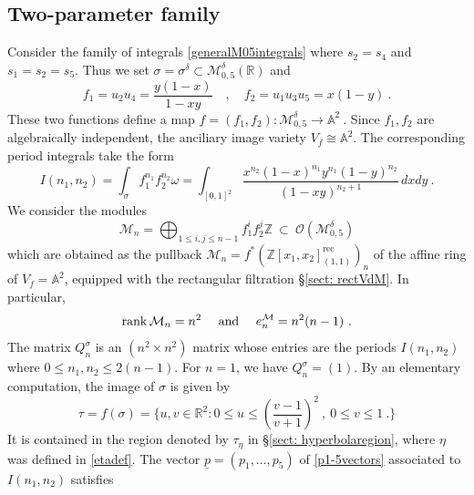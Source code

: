\documentclass[a4paper,10pt]{amsart}
\theoremstyle{definition}
\theoremstyle{remark}
\numberwithin{equation}{section}
\newcommand{\Z}{\mathbb Z}
\newcommand{\R}{\mathbb R}
\newcommand{\Or}{\mathcal{O}}
\newcommand{\rank}{\mathrm{rank}}
\newcommand{\0}{\color{blue}{\mathsf{0}}}
\begin{document}
    \subsection{Two-parameter family}  Consider the family of integrals   \eqref{generalM05integrals} where $s_2=s_4$ and $s_1=s_2=s_5$.
    Thus we set $\sigma = \sigma^{\delta} \subset \mathcal{M}_{0,5}^{\delta}(\R)$ and  
    \begin{equation} \label{M052paramchoices} f_1=  u_2u_4 = \frac{ y(1-x)}{1-xy}  \quad , \quad f_2 = u_1u_3u_5 = x(1-y)  \ . 
    \end{equation}
    These two functions define a map 
    $f=(f_1,f_2) : \mathcal{M}_{0,5}^{\delta} \rightarrow \mathbb{A}^2\ . $
    Since $f_1,f_2$ are algebraically independent, the anciliary image variety $V_f \cong  \mathbb{A}^2$.
      The corresponding period integrals take the form     \[  I(n_1,n_2) =  \int_{\sigma}   f_1^{n_1} f_2^{n_2} \omega =  \int_{[0,1]^2}   \frac{  x^{n_2} (1-x)^{n_1} y^{n_1} (1-y)^{n_2}}{ (1-xy)^{n_2+1} } \, dx dy  \ . \]
      We consider the modules  
      \begin{equation} \label{Mndefnzeta2} \mathcal{M}_n  = \bigoplus_{1\leq i,j\leq n-1}  f_1^i f_2^j  \Z  \  \subset  \ \Or (\mathcal{M}_{0,5}^{\delta})  \end{equation}
      which are obtained as  the pullback $\mathcal{M}_n = f^* (\Z[x_1,x_2]^{\mathrm{rec}}_{(1,1)})_n$ of the affine ring of $V_f = \mathbb{A}^2$,  equipped with the rectangular filtration \S\ref{sect: rectVdM}. In particular,
      \begin{equation} \label{rankexponentoftwoparamexample} \rank \, \mathcal{M}_n = n^2 \quad \hbox{ and } \quad e^{\mathcal{M}}_n = n^2(n-1)\ . 
      \end{equation}
      The matrix $Q^{\sigma}_n$ is an $(n^2 \times n^2)$ matrix whose  entries are the periods $I(n_1,n_2)$ where $0\leq n_1,n_2 \leq  2(n-1)$.  
      For $n=1$, we have $Q^{\sigma}_n= (1)$. 
       By an elementary computation, the image of $\sigma$  is given by 
  \begin{equation}   \label{tauregion2paramfamily} \tau = f(\sigma)= \{ u,v \in \R^2: 0\leq u \leq \left(\frac{v-1}{v+1} \right)^2  \ , \  0\leq v\leq 1 \ .\}   \end{equation} 
  It is contained in the region denoted by  $\tau_{\eta}$ in  \S\ref{sect: hyperbolaregion},  where $\eta$ was defined in \eqref{etadef}. 
    The vector $\underline{p}= (p_1,\ldots, p_5)$  of  \eqref{p1-5vectors}  associated to $I(n_1,n_2)$ satisfies
\end{document}
